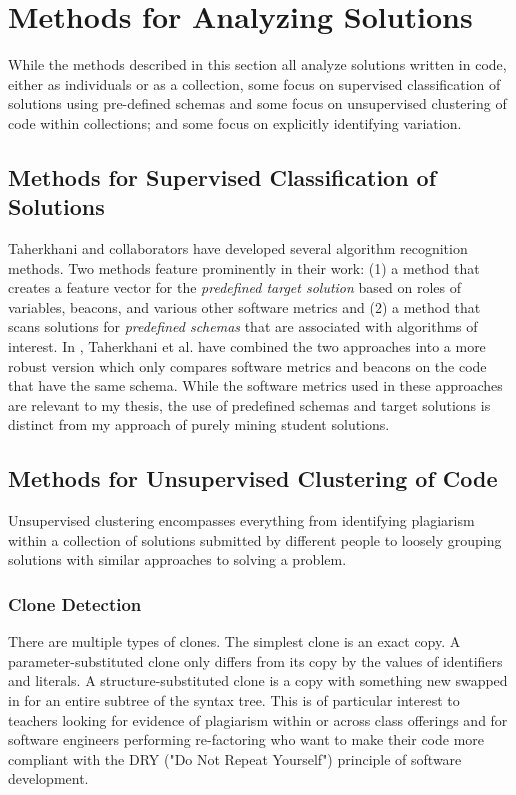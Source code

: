 \section{Methods for Analyzing Solutions}

While the methods described in this section all analyze solutions written in code, either as individuals or as a collection, some focus on supervised classification of solutions using pre-defined schemas and some focus on unsupervised clustering of code within collections; and some focus on explicitly identifying variation.

\subsection{Methods for Supervised Classification of Solutions}

Taherkhani and collaborators have developed several algorithm recognition methods. Two methods feature prominently in their work: (1) a method that creates a feature vector for the \emph{predefined target solution} based on roles of variables, beacons, and various other software metrics and (2) a method that scans solutions for \emph{predefined schemas} that are associated with algorithms of interest. In \cite{taherkhani13}, Taherkhani et al. have combined the two approaches into a more robust version which only compares software metrics and beacons on the code that have the same schema. While the software metrics used in these approaches are relevant to my thesis, the use of predefined schemas and target solutions is distinct from my approach of purely mining student solutions.

\subsection{Methods for Unsupervised Clustering of Code}

Unsupervised clustering encompasses everything from identifying plagiarism within a collection of solutions submitted by different people to loosely grouping solutions with similar approaches to solving a problem.

\subsubsection{Clone Detection}
There are multiple types of clones. The simplest clone is an exact copy. A parameter-substituted clone only differs from its copy by the values of identifiers and literals. A structure-substituted clone is a copy with something new swapped in for an entire subtree of the syntax tree. This is of particular interest to teachers looking for evidence of plagiarism within or across class offerings and for software engineers performing re-factoring who want to make their code more compliant with the DRY ("Do Not Repeat Yourself") principle of software development.

